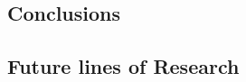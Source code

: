 \documentclass[../main.tex]{subfiles}
\begin{document}
\subsection{Conclusions}
\blindtext

\subsection{Future lines of Research}
\blindtext
\end{document}
